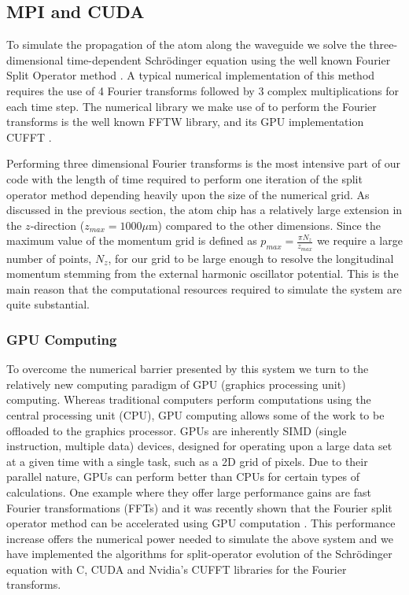 \subsection{MPI and CUDA}
\label{sec:MPICUDA}

To simulate the propagation of the atom along the waveguide we solve the three-dimensional time-dependent Schr\"odinger equation using the well known Fourier Split Operator method \cite{Fleck:splitop}. A typical numerical implementation of this method requires the use of 4 Fourier transforms followed by 3 complex multiplications for each time step. The numerical library we make use of to perform the Fourier transforms is the well known FFTW library, and its GPU implementation CUFFT \cite{Nvidia:cufft_4_1}.

Performing three dimensional Fourier transforms is the most intensive part of our code with the length of time required to perform one iteration of the split operator method depending heavily upon the size of the numerical grid. As discussed in the previous section, the atom chip has a relatively large extension in the $z$-direction  ($z_{max}=1000 \mu$m) compared to the other dimensions. Since the maximum value of the momentum grid is defined as $p_{max} = \frac{\pi N_z}{z_{max}}$ we require a large number of points, $N_z$, for our grid to be large enough to resolve the longitudinal momentum stemming from the external harmonic oscillator potential. This is the main reason that the computational resources required to simulate the system are quite substantial.

\subsubsection{GPU Computing}

To overcome the numerical barrier presented by this system we turn to the relatively new computing paradigm of GPU (graphics processing unit) computing. Whereas traditional computers perform computations using the central processing unit (CPU), GPU computing allows some of the work to be offloaded to the graphics processor. GPUs are inherently SIMD (single instruction, multiple data) devices, designed for operating upon a large data set at a given time with a single task, such as a 2D grid of pixels. Due to their parallel nature, GPUs can perform better than CPUs for certain types of calculations. One example where they offer large performance gains are fast Fourier transformations (FFTs) and it was recently shown that the Fourier split operator method can be accelerated using GPU computation \cite{Bauke:11}. This performance increase offers the numerical power needed to simulate the above system and we have implemented the algorithms for split-operator evolution of the Schr\"odinger equation with C, CUDA and Nvidia's CUFFT libraries for the Fourier transforms. 

